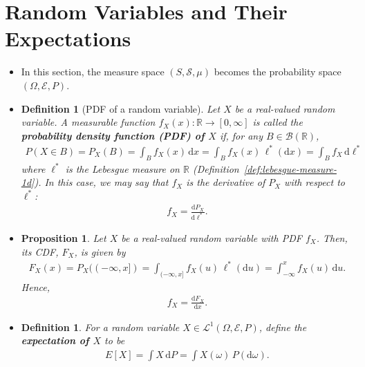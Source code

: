 \documentclass[10pt]{article}
\newtheorem{definition}[lemma]{Definition}
\newtheorem{proposition}[lemma]{Proposition}
\numberwithin{lemma}{section}
\newcommand{\dee}{\mathrm{d}}
\newcommand{\mcal}[1]{\mathcal{#1}}
\newcommand{\Real}{\mathbb{R}}
\begin{document}
\section{Random Variables and Their Expectations}

\begin{itemize}
  \item In this section, the measure space $(S,\mcal{S},\mu)$ becomes the probability space $(\Omega,\mcal{E},P)$.
 
  \item \begin{definition}[PDF of a random variable]
    Let $X$ be a real-valued random variable. A measurable function $f_X(x): \Real \rightarrow [0, \infty]$ is called the {\bf probability density function (PDF) of $X$} if, for any $B \in \mcal{B}(\Real)$,
    \begin{align*}
      P(X \in B) = P_X(B) = \int_B f_X(x)\, \dee x = \int_B f_X(x)\, \ell^*(\dee x) = \int_B f_X\, \dee\ell^* 
    \end{align*}  
    where $\ell^*$ is the Lebesgue measure on $\Real$ (Definition~\ref{def:lebesgue-measure-1d}). In this case, we may say that $f_X$ is the derivative of $P_X$ with respect to $\ell^*$:
    \begin{align*}
      f_X = \frac{\dee P_X}{\dee \ell^*}.
    \end{align*}    
  \end{definition}  

  \item \begin{proposition}
    Let $X$ be a real-valued random variable with PDF $f_X$. Then, its CDF, $F_X$, is given by
    \begin{align*}
      F_X(x) = P_X((-\infty,x]) = \int_{(-\infty,x]} f_X(u)\, \ell^*(\dee u) = \int_{-\infty}^x f_X(u)\, \dee u.
    \end{align*}
    Hence,
    \begin{align*}
      f_X = \frac{\dee F_X}{\dee x}.
    \end{align*}
  \end{proposition}

  \item \begin{definition}
    For a random variable $X \in \mcal{L}^1(\Omega,\mcal{E},P)$, define the {\bf expectation of $X$} to be
    \begin{align*}
      E[X] = \int X\, \dee P = \int X(\omega)\, P(\dee \omega).
    \end{align*}
  \end{definition}


\end{itemize}
\end{document}
